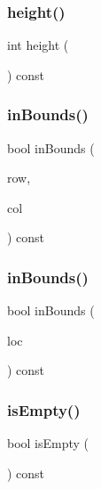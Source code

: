 \subsubsection{\texorpdfstring{height()}{height()}}
{\footnotesize\ttfamily int height (\begin{DoxyParamCaption}{ }\end{DoxyParamCaption}) const}

\mbox{\label{classGrid_aa0a86249b1e35e3b741f1e19283c298a}} 
\subsubsection{\texorpdfstring{in\+Bounds()}{inBounds()}\hspace{0.1cm}{\footnotesize\ttfamily [1/2]}}
{\footnotesize\ttfamily bool in\+Bounds (\begin{DoxyParamCaption}\item[{int}]{row,  }\item[{int}]{col }\end{DoxyParamCaption}) const}

\mbox{\label{classGrid_a1b7d34c13c853a2ac9bdc084ec1535e9}} 
\subsubsection{\texorpdfstring{in\+Bounds()}{inBounds()}\hspace{0.1cm}{\footnotesize\ttfamily [2/2]}}
{\footnotesize\ttfamily bool in\+Bounds (\begin{DoxyParamCaption}\item[{const \mbox{\hyperlink{structGridLocation}{Grid\+Location}} \&}]{loc }\end{DoxyParamCaption}) const}

\mbox{\label{classGrid_acf82f9b2937375c7b1cf3dccb3df3312}} 
\subsubsection{\texorpdfstring{is\+Empty()}{isEmpty()}}
{\footnotesize\ttfamily bool is\+Empty (\begin{DoxyParamCaption}{ }\end{DoxyParamCaption}) const}

